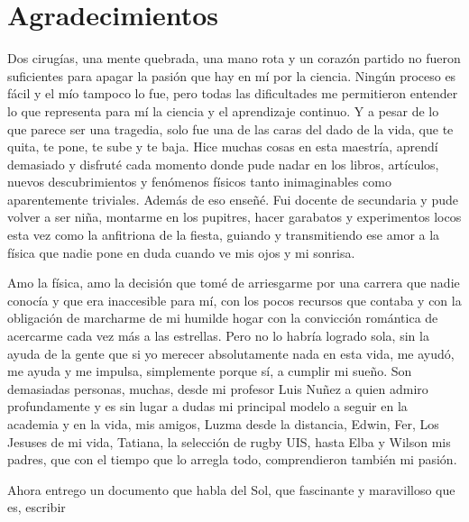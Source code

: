 \newpage
\chapter*{Agradecimientos}
Dos cirugías, una mente quebrada, una mano rota y un corazón partido no fueron suficientes para apagar la pasión que hay en mí por la ciencia. Ningún proceso es fácil y el mío tampoco lo fue, pero todas las dificultades me permitieron entender lo que representa para mí la ciencia y el aprendizaje continuo. Y a pesar de lo que parece ser una tragedia, solo fue una de las caras del dado de la vida, que te quita, te pone, te sube y te baja. Hice muchas cosas en esta maestría, aprendí demasiado y disfruté cada momento donde pude nadar en los libros, artículos, nuevos descubrimientos y fenómenos físicos tanto inimaginables como aparentemente triviales. Además de eso enseñé. Fui docente de secundaria y pude volver a ser niña, montarme en los pupitres, hacer garabatos y experimentos locos esta vez como la anfitriona de la fiesta, guiando y transmitiendo ese amor a la física que nadie pone en duda cuando ve mis ojos y mi sonrisa.

Amo la física, amo la decisión que tomé de arriesgarme por una carrera que nadie conocía y que era inaccesible para mí, con los pocos recursos que contaba y con la obligación de marcharme de mi humilde hogar con la convicción romántica de acercarme cada vez más a las estrellas. Pero no lo habría logrado sola, sin la ayuda de la gente que si yo merecer absolutamente nada en esta vida, me ayudó, me ayuda y me impulsa, simplemente porque sí, a cumplir mi sueño. Son demasiadas personas, muchas, desde mi profesor Luis Nuñez a quien admiro profundamente y es sin lugar a dudas mi principal modelo a seguir en la academia y en la vida, mis amigos, Luzma desde la distancia, Edwin, Fer, Los Jesuses de mi vida, Tatiana, la selección de rugby UIS, hasta Elba y Wilson mis padres, que con el tiempo que lo arregla todo, comprendieron también mi pasión.

Ahora entrego un documento que habla del Sol, que fascinante y maravilloso que es, escribir